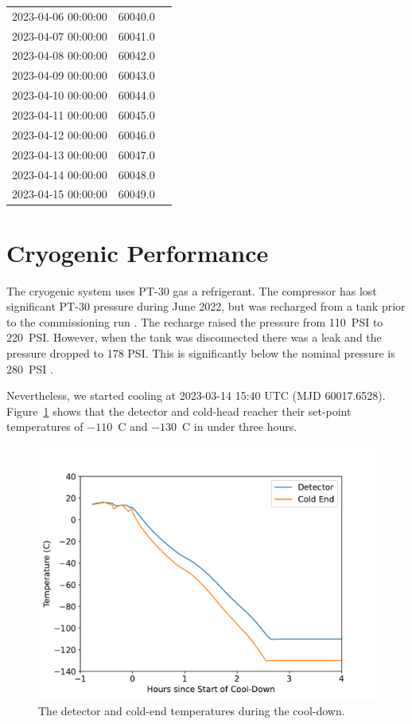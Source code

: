 \documentclass{article}
\begin{document}
\begin{table}[pb]
\begin{center}
\begin{tabular}{lll}
2023-04-06 00:00:00&60040.0\\
2023-04-07 00:00:00&60041.0\\
2023-04-08 00:00:00&60042.0\\
2023-04-09 00:00:00&60043.0\\
2023-04-10 00:00:00&60044.0\\
2023-04-11 00:00:00&60045.0\\
2023-04-12 00:00:00&60046.0\\
2023-04-13 00:00:00&60047.0\\
2023-04-14 00:00:00&60048.0\\
2023-04-15 00:00:00&60049.0\\
\hline
\end{tabular}
\end{center}
\end{table}

\clearpage
\section{Cryogenic Performance}

The cryogenic system uses PT-30 gas a refrigerant.
The compressor has lost significant PT-30 pressure during June 2022, but was recharged from a tank prior to the commissioning run \cite[p.~17]{dolon}. The recharge raised the pressure from 110~PSI to 220~PSI. However, when the tank was disconnected there was a leak and the pressure dropped to 178 PSI. This is significantly below the nominal pressure is 280~PSI \cite[p.~4]{service-cabinet}.

Nevertheless, we started cooling at 2023-03-14 15:40 UTC (MJD 60017.6528). Figure~\ref{figure:cool-down} shows that the detector and cold-head reacher their set-point temperatures of $-110$~C and $-130$~C in under three hours.

\begin{figure}[pb]
\begin{center}
\includegraphics[width=0.7\columnwidth]{figures/cool-down.pdf}
\medskip
\caption{The detector and cold-end temperatures during the cool-down.}
\label{figure:cool-down}
\end{center}
\end{figure}
\end{document}
